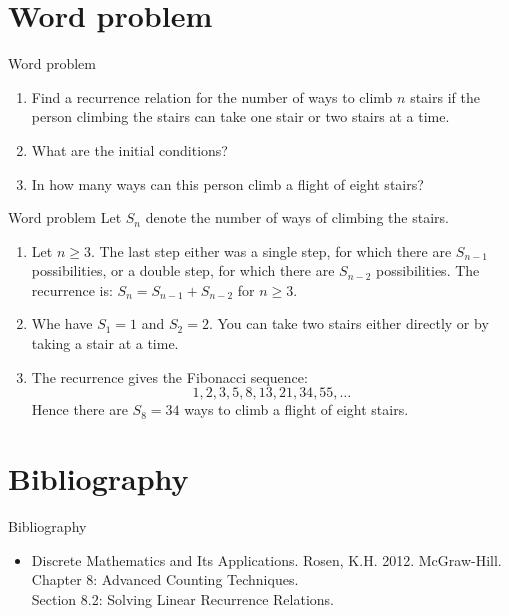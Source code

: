 \documentclass{beamer}
\begin{document}
\section{Word problem}

\begin{frame}{Word problem}
    \begin{enumerate}[<+->]
        \item Find a recurrence relation for the number of ways to climb $n$ stairs if the person climbing the stairs can take one stair or two stairs at a time.
        \item What are the initial conditions?
        \item In how many ways can this person climb a flight of eight stairs?
    \end{enumerate}
\end{frame}

\begin{frame}{Word problem}
    Let $S_n$ denote the number of ways of climbing the stairs.
    \begin{enumerate}[<+->]
        \item Let $n \geq 3$.  The last step either was a single step, for which there are $S_{n-1}$ possibilities, or a double step, for which there are $S_{n-2}$ possibilities.  The recurrence is: $ S_n = S_{n-1} + S_{n-2} $ for $n \geq 3$.
        \item Whe have $S_1 = 1$ and $S_2 = 2$.  You can take two stairs either directly or by taking a stair at a time.
        \item The recurrence gives the Fibonacci sequence:
        $$ 1,2,3,5,8,13,21,34,55,\ldots $$
        Hence there are $S_8 = 34$ ways to climb a flight of eight stairs.
    \end{enumerate}
\end{frame}

\section*{Bibliography}

\begin{frame}{Bibliography}
    \begin{itemize}
        \item Discrete Mathematics and Its Applications. Rosen, K.H. 2012. McGraw-Hill. \\
        Chapter 8: Advanced Counting Techniques. \\
        Section 8.2: Solving Linear Recurrence Relations.
    \end{itemize}
\end{frame}
\end{document}
